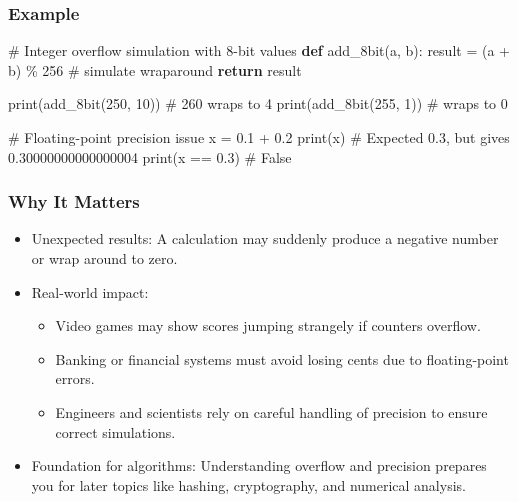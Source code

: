\documentclass[
  letterpaper,
  DIV=11,
  numbers=noendperiod]{scrreprt}
\newenvironment{Shaded}{\begin{snugshade}}{\end{snugshade}}
\newcommand{\BuiltInTok}[1]{\textcolor[rgb]{0.00,0.23,0.31}{#1}}
\newcommand{\CommentTok}[1]{\textcolor[rgb]{0.37,0.37,0.37}{#1}}
\newcommand{\ControlFlowTok}[1]{\textcolor[rgb]{0.00,0.23,0.31}{\textbf{#1}}}
\newcommand{\DecValTok}[1]{\textcolor[rgb]{0.68,0.00,0.00}{#1}}
\newcommand{\FloatTok}[1]{\textcolor[rgb]{0.68,0.00,0.00}{#1}}
\newcommand{\KeywordTok}[1]{\textcolor[rgb]{0.00,0.23,0.31}{\textbf{#1}}}
\newcommand{\NormalTok}[1]{\textcolor[rgb]{0.00,0.23,0.31}{#1}}
\newcommand{\OperatorTok}[1]{\textcolor[rgb]{0.37,0.37,0.37}{#1}}
\providecommand{\tightlist}{%
  \setlength{\itemsep}{0pt}\setlength{\parskip}{0pt}}
\begin{document}
\subsubsection{Example}\label{example}

\begin{Shaded}
\begin{Highlighting}[]
\CommentTok{\# Integer overflow simulation with 8{-}bit values}
\KeywordTok{def}\NormalTok{ add\_8bit(a, b):}
\NormalTok{    result }\OperatorTok{=}\NormalTok{ (a }\OperatorTok{+}\NormalTok{ b) }\OperatorTok{\%} \DecValTok{256}  \CommentTok{\# simulate wraparound}
    \ControlFlowTok{return}\NormalTok{ result}

\BuiltInTok{print}\NormalTok{(add\_8bit(}\DecValTok{250}\NormalTok{, }\DecValTok{10}\NormalTok{))   }\CommentTok{\# 260 wraps to 4}
\BuiltInTok{print}\NormalTok{(add\_8bit(}\DecValTok{255}\NormalTok{, }\DecValTok{1}\NormalTok{))    }\CommentTok{\# wraps to 0}

\CommentTok{\# Floating{-}point precision issue}
\NormalTok{x }\OperatorTok{=} \FloatTok{0.1} \OperatorTok{+} \FloatTok{0.2}
\BuiltInTok{print}\NormalTok{(x)           }\CommentTok{\# Expected 0.3, but gives 0.30000000000000004}
\BuiltInTok{print}\NormalTok{(x }\OperatorTok{==} \FloatTok{0.3}\NormalTok{)    }\CommentTok{\# False}
\end{Highlighting}
\end{Shaded}

\subsubsection{Why It Matters}\label{why-it-matters-9}

\begin{itemize}
\tightlist
\item
  Unexpected results: A calculation may suddenly produce a negative
  number or wrap around to zero.
\item
  Real-world impact:

  \begin{itemize}
  \tightlist
  \item
    Video games may show scores jumping strangely if counters overflow.
  \item
    Banking or financial systems must avoid losing cents due to
    floating-point errors.
  \item
    Engineers and scientists rely on careful handling of precision to
    ensure correct simulations.
  \end{itemize}
\item
  Foundation for algorithms: Understanding overflow and precision
  prepares you for later topics like hashing, cryptography, and
  numerical analysis.
\end{itemize}
\end{document}
